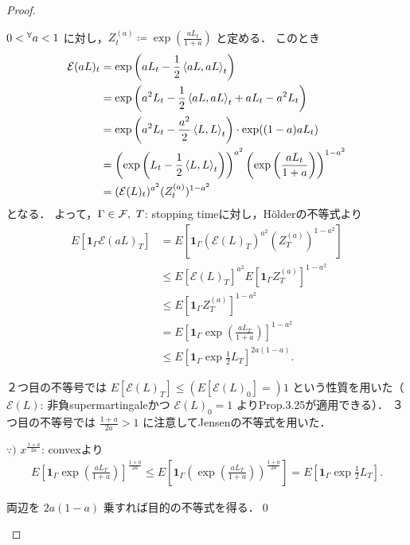 \documentclass{jsarticle}
\begin{document}
\begin{proof}
\begin{description}
        $0<{}^{\forall} a<1$ に対し，$Z_t^{(a)}\coloneqq\exp(\frac{aL_t}{1+a})$ と定める．
        このとき
        \begin{align}
            \mathcal{E}(aL)_t
            &= \exp\left(aL_t-\frac{1}{2}\left\langle aL,aL\right\rangle_t\right) \\
            &= \exp\left(a^2 L_t-\frac{1}{2}\left\langle aL,aL\right\rangle_t+aL_t-a^2 L_t\right) \\
            &= \exp\left(a^2 L_t-\frac{a^2}{2}\left\langle L,L\right\rangle_t\right)\cdot\exp((1-a)aL_t) \\
            &= \left(\exp\left(L_t-\frac{1}{2}\left\langle L,L\right\rangle_t\right)\right)^{a^2}\left(\exp\left(\frac{aL_t}{1+a}\right)\right)^{1-a^2} \\
            &= (\mathcal{E}(L)_t)^{a^2}(Z_t^{(a)})^{1-a^2}
        \end{align}
        となる．
        よって，$\Gamma\in\mathcal{F},\ T$: stopping timeに対し，H\"{o}lderの不等式より
        \begin{align}
            E[\bm{1}_\Gamma\mathcal{E}(aL)_T]
            &= E[\bm{1}_\Gamma(\mathcal{E}(L)_T)^{a^2}(Z_T^{(a)})^{1-a^2}] \\
            &\le E[\mathcal{E}(L)_T]^{a^2}
            E[\bm{1}_\Gamma Z_T^{(a)}]^{1-a^2} \\
            &\le E[\bm{1}_\Gamma Z_T^{(a)}]^{1-a^2} \\
            &= E\left[\bm{1}_\Gamma\exp\left(\frac{aL_T}{1+a}\right)\right]^{1-a^2} \\
            &\le E\left[\bm{1}_\Gamma\exp\frac{1}{2}L_T\right]^{2a(1-a)}.
        \end{align}

        ２つ目の不等号では $E[\mathcal{E}(L)_T]\le(E[\mathcal{E}(L)_0]=)1$ という性質を用いた（$\mathcal{E}(L)$: 非負supermartingaleかつ $\mathcal{E}(L)_0=1$ よりProp.3.25が適用できる）．
        ３つ目の不等号では $\frac{1+a}{2a}>1$ に注意してJensenの不等式を用いた．

        $\because)$ $x^{\frac{1+a}{2a}}$: convexより
        \begin{align}
            E\left[\bm{1}_\Gamma\exp\left(\frac{aL_T}{1+a}\right)\right]^{\frac{1+a}{2a}}
            \le E\left[\bm{1}_\Gamma\left(\exp\left(\frac{aL_T}{1+a}\right)\right)^{\frac{1+a}{2a}}\right]
            = E\left[\bm{1}_\Gamma\exp\frac{1}{2}L_T\right].
        \end{align}

        両辺を $2a(1-a)$ 乗すれば目的の不等式を得る．\qed
        

\end{description}
\end{proof}
\end{document}
